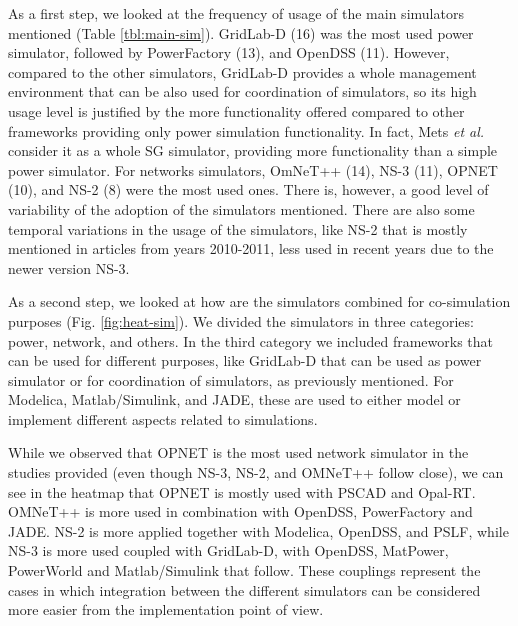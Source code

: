 \documentclass[1p]{elsarticle} %
\begin{document}
As a first step, we looked at the frequency of usage of the main simulators mentioned (Table \ref{tbl:main-sim}). GridLab-D (16) was the most used power simulator, followed by PowerFactory (13), and OpenDSS (11). However, compared to the other simulators, GridLab-D provides a whole management environment that can be also used for coordination of simulators, so its high usage level is justified by the more functionality offered compared to other frameworks providing only power simulation functionality. In fact, Mets \textit{et al.} \citep{ref:mets2014combining} consider it as a whole SG simulator, providing more functionality than a simple power simulator. For networks simulators, OmNeT++ (14), NS-3 (11), OPNET (10), and NS-2 (8)  were the most used ones. There is, however, a good level of variability of the adoption of the simulators mentioned. There are also some temporal variations in the usage of the simulators, like NS-2 that is mostly mentioned in articles from years 2010-2011, less used in recent years due to the newer version NS-3.





As a second step, we looked at how are the simulators combined for co-simulation purposes (Fig. \ref{fig:heat-sim}).  We divided the simulators in three categories: power, network, and others. In the third category we  included frameworks that can be used for different purposes, like GridLab-D that can be used as power simulator or for coordination of simulators, as previously mentioned. For Modelica, Matlab/Simulink, and JADE, these are used to either model or implement different aspects related to simulations. 

While we observed that OPNET is the most used network simulator in the studies provided (even though NS-3, NS-2, and OMNeT++ follow close), we can see in the heatmap that OPNET is mostly used with PSCAD and Opal-RT. OMNeT++ is more used in combination with OpenDSS, PowerFactory and JADE. NS-2 is more applied together with Modelica, OpenDSS, and PSLF, while NS-3 is more used coupled with GridLab-D, with OpenDSS, MatPower, PowerWorld and Matlab/Simulink that follow. These couplings represent the cases in which integration between the different simulators can be considered more easier from the implementation point of view.
\end{document}
